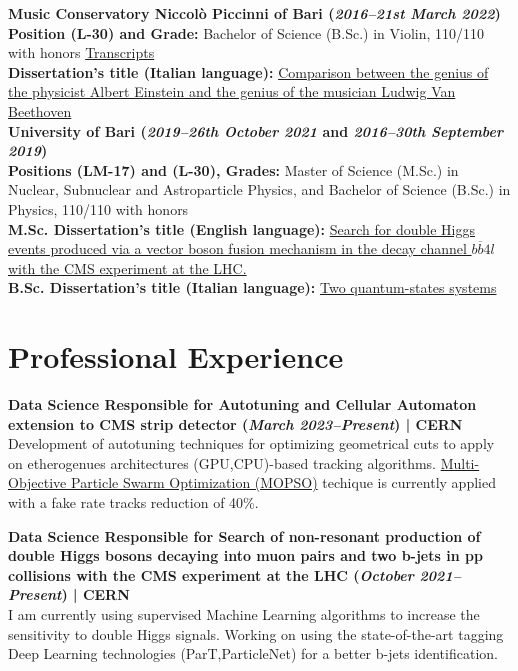 \documentclass[11pt]{res}
\newcommand{\MarginText}[1]{\section{#1}\vspace{10pt}}
\begin{document}
\begin{resume}
\textbf{Music Conservatory Niccolò Piccinni of Bari (\textit{2016--21st March 2022})}\\
\textbf{Position (L-30) and Grade:} Bachelor of Science (B.Sc.) in Violin, 110/110 with honors \href{https://drive.google.com/file/d/1aV1ERPqgSpQ-9SRbWIpw-Q4BkuS1kvyy/view?usp=share_link}{Transcripts}\\
\textbf{Dissertation's title (Italian language):}
\href{https://drive.google.com/file/d/1D4PbAL-X92U5CsQO8JGemSHA03GEtdu0/view?usp=share_link}{Comparison between the genius of the physicist Albert Einstein and the genius of the musician Ludwig Van Beethoven}\\

\textbf{University of Bari (\textit{2019--26th October 2021} and \textit{2016--30th September 2019})}\\
\textbf{Positions (LM-17) and (L-30), Grades:} Master of Science (M.Sc.) in Nuclear, Subnuclear and Astroparticle Physics, and Bachelor of Science (B.Sc.) in Physics, 110/110 with honors\\
\textbf{M.Sc. Dissertation's title (English language):}
\href{https://inspirehep.net/literature/1955669}{Search for double Higgs events produced via a vector boson fusion mechanism in the decay channel $b\overline{b}4l$ with the CMS experiment at the LHC.}\\
\textbf{B.Sc. Dissertation's title (Italian language):} 
\href{https://drive.google.com/file/d/1fyNx6B4lviqkeJxsrIEsZ-UJhCTqDaSC/view?usp=share_link}{Two quantum-states systems}\\


\MarginText{Professional Experience}

\textbf{Data Science Responsible for Autotuning and Cellular Automaton extension to CMS strip detector (\textit{March 2023--Present}) | CERN}\\
Development of autotuning techniques for optimizing geometrical cuts to apply on etherogenues architectures (GPU,CPU)-based tracking algorithms. \href{https://github.com/bdanzi/CA-parameter-tuning}{Multi-Objective Particle Swarm Optimization (MOPSO)} techique is currently applied with a fake rate tracks reduction of 40\%.

\textbf{Data Science Responsible for Search of non-resonant production of double Higgs bosons decaying into muon pairs and two b-jets in pp collisions with the CMS experiment at the LHC (\textit{October 2021--Present}) | CERN}\\
I am currently using supervised Machine Learning algorithms to increase the sensitivity to double Higgs signals. Working on using the state-of-the-art tagging Deep Learning technologies (ParT,ParticleNet) for a better b-jets identification.\\


\end{resume}
\end{document}
